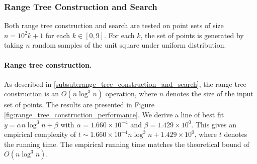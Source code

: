 \documentclass{article}
\newcommand{\figref}[1]{Figure \ref{#1}}
\begin{document}
\subsubsection{Range Tree Construction and Search}

Both range tree construction and search are tested on point sets of size $n = 10^2 k+1$ for each $k \in [0, 9]$. For each $k$, the set of points is generated by taking $n$ random samples of the unit square under uniform distribution.

\paragraph{Range tree construction.} As described in \ref{subsub:range_tree_construction_and_search}, the range tree construction is an $O(n\log^3 n)$ operation, where $n$ denotes the size of the input set of points. The results are presented in \figref{fig:range_tree_construction_performance}. We derive a line of best fit $y = \alpha n \log^3 n + \beta$ with $\alpha = 1.660 \times 10^{-4}$ and $\beta = 1.429 \times 10^{0}$. This gives an empirical complexity of $t \sim 1.660 \times 10^{-4} n\log^3 n + 1.429 \times 10^{0}$, where $t$ denotes the running time. The empirical running time matches the theoretical bound of $O(n \log^3 n)$.
\end{document}
